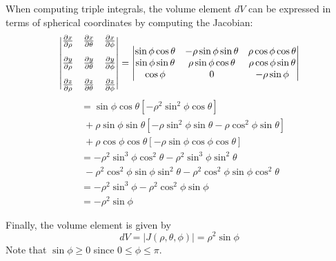 \documentclass[handout]{ximera}
\begin{document}
When computing triple integrals, the volume element $dV$ can be expressed in terms of spherical coordinates by computing the Jacobian:
\[
\begin{vmatrix}
\frac{\partial x}{\partial \rho} & \frac{\partial x}{\partial \theta} &\frac{\partial x}{\partial \phi}\\[10pt]
\frac{\partial y}{\partial \rho} & \frac{\partial y}{\partial \theta} &\frac{\partial y}{\partial \phi}\\[10pt]
\pp[z]{\rho} & \frac{\partial z}{\partial \theta} &\frac{\partial z}{\partial \phi}
\end{vmatrix}
= 
\begin{vmatrix}
\sin \phi \cos \theta& -\rho \sin \phi \sin \theta &\rho \cos \phi \cos \theta\\ 
\sin \phi \sin \theta& \rho \sin \phi \cos\theta &\rho \cos \phi \sin \theta\\ 
 \cos \phi & 0 &-\rho \sin \phi\\
\end{vmatrix}
\]
\begin{align*}
&= \sin \phi \cos \theta \left[-\rho^2 \sin^2\phi\cos\theta \right]\\
 &\;+\rho \sin \phi \sin \theta\left[-\rho\sin^2\phi\sin\theta- \rho\cos^2\phi\sin\theta\right]\\
 & \;+ \rho \cos \phi \cos \theta \left[-\rho \sin\phi\cos\phi\cos\theta\right]\\
 &= -\rho^2 \sin^3\phi \cos^2\theta -\rho^2 \sin^3\phi \sin^2\theta \\
 & \; - \rho^2 \cos^2\phi \sin\phi \sin^2\theta - \rho^2 \cos^2\phi \sin\phi \cos^2\theta\\
  &= -\rho^2\sin^3\phi - \rho^2\cos^2\phi\sin\phi\\
 &=-\rho^2 \sin \phi
\end{align*}
 
Finally, the volume element is given by
\[
dV = |J(\rho, \theta, \phi)| = \rho^2 \sin \phi
\]
Note that $\sin \phi \geq 0$ since $0 \leq \phi \leq \pi$.
\end{document}
